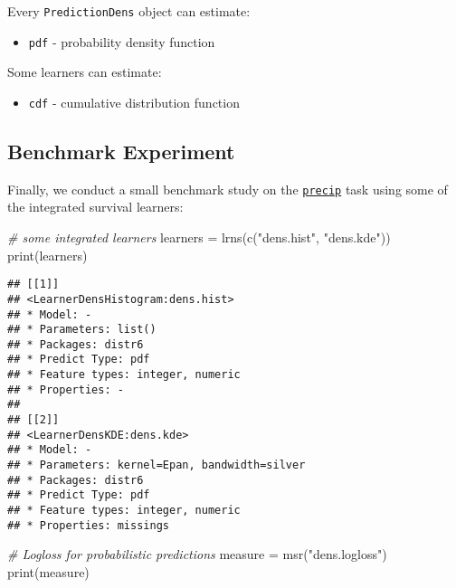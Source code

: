 \documentclass[
]{scrbook}
\newenvironment{Shaded}{\begin{snugshade}}{\end{snugshade}}
\newcommand{\CommentTok}[1]{\textcolor[rgb]{0.56,0.35,0.01}{\textit{#1}}}
\newcommand{\FunctionTok}[1]{\textcolor[rgb]{0.00,0.00,0.00}{#1}}
\newcommand{\NormalTok}[1]{#1}
\newcommand{\OtherTok}[1]{\textcolor[rgb]{0.56,0.35,0.01}{#1}}
\newcommand{\StringTok}[1]{\textcolor[rgb]{0.31,0.60,0.02}{#1}}
\providecommand{\tightlist}{%
  \setlength{\itemsep}{0pt}\setlength{\parskip}{0pt}}
\renewenvironment{Shaded} {\begin{snugshade}\small} {\end{snugshade}}
\begin{document}
Every \texttt{PredictionDens} object can estimate:

\begin{itemize}
\tightlist
\item
  \texttt{pdf} - probability density function
\end{itemize}

Some learners can estimate:

\begin{itemize}
\tightlist
\item
  \texttt{cdf} - cumulative distribution function
\end{itemize}

\hypertarget{benchmark-experiment-1}{%
\subsection{Benchmark Experiment}\label{benchmark-experiment-1}}

Finally, we conduct a small benchmark study on the \href{https://mlr3proba.mlr-org.com/reference/mlr_tasks_precip.html}{\texttt{precip}} task using some of the integrated survival learners:

\begin{Shaded}
\begin{Highlighting}[]
\CommentTok{\# some integrated learners}
\NormalTok{learners }\OtherTok{=} \FunctionTok{lrns}\NormalTok{(}\FunctionTok{c}\NormalTok{(}\StringTok{"dens.hist"}\NormalTok{, }\StringTok{"dens.kde"}\NormalTok{))}
\FunctionTok{print}\NormalTok{(learners)}
\end{Highlighting}
\end{Shaded}

\begin{verbatim}
## [[1]]
## <LearnerDensHistogram:dens.hist>
## * Model: -
## * Parameters: list()
## * Packages: distr6
## * Predict Type: pdf
## * Feature types: integer, numeric
## * Properties: -
## 
## [[2]]
## <LearnerDensKDE:dens.kde>
## * Model: -
## * Parameters: kernel=Epan, bandwidth=silver
## * Packages: distr6
## * Predict Type: pdf
## * Feature types: integer, numeric
## * Properties: missings
\end{verbatim}

\begin{Shaded}
\begin{Highlighting}[]
\CommentTok{\# Logloss for probabilistic predictions}
\NormalTok{measure }\OtherTok{=} \FunctionTok{msr}\NormalTok{(}\StringTok{"dens.logloss"}\NormalTok{)}
\FunctionTok{print}\NormalTok{(measure)}
\end{Highlighting}
\end{Shaded}
\end{document}
